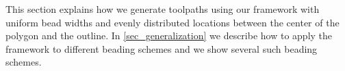 This section explains how we generate toolpaths using our framework with uniform bead widths and evenly distributed locations between the center of the polygon and the outline.
In \cref{sec_generalization} we describe how to apply the framework to different beading schemes and we show several such beading schemes.










